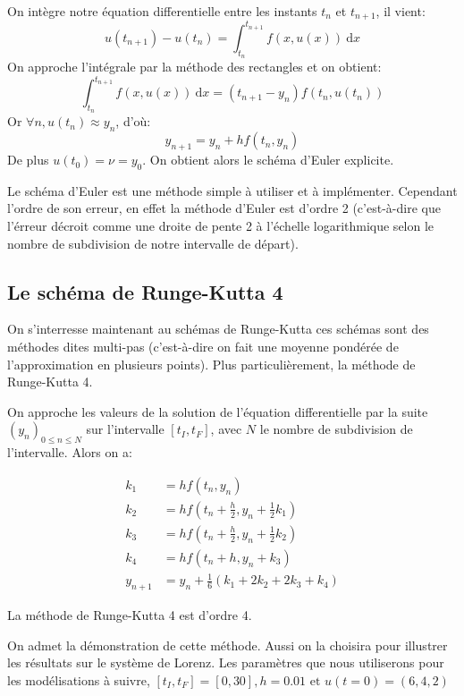 \documentclass{article}
\newcommand{\cad}{c'est-\`a-dire }
\newtheorem[M , nocut]{prop}{Proposition}[section]
\newtheorem[S , nocut]{definition}{Définition}
\newtheorem[S , nocut]{lemme}{Lemme}
\newtheorem[L , nocut]{thm}{Théoreme}
\newtheorem[L , nocut]{cor}{Corollaire}
\begin{document}
\begin{example}
    On intègre notre équation differentielle entre les instants $t_{n}$ et $t_{n+1}$, il vient:
    \[
      u(t_{n+1}) - u(t_n) = \int_{t_n}^{t_{n+1}} f(x,u(x))\ \mathrm{d}x
    \]
    On approche l'intégrale par la méthode des rectangles et on obtient:
    \[
        \int_{t_n}^{t_{n+1}} f(x,u(x))\ \mathrm{d}x = (t_{n+1}-y_n)f(t_n,u(t_n))
    \]Or $\forall n , u(t_n) \approx y_n $, d'où:
    \[
        y_{n+1} = y_n + h f(t_n,y_n)
    \]De plus $u(t_0) = \nu = y_0$. On obtient alors le schéma d'Euler explicite.
\end{example}
Le schéma d'Euler est une méthode simple à utiliser et à implémenter. Cependant l'ordre de son erreur, en effet la méthode d'Euler est d'ordre 2 (\cad que l'érreur décroit comme une droite de pente 2 à l'échelle logarithmique selon le nombre de subdivision de notre intervalle de départ). 
\subsection*{Le schéma de Runge-Kutta 4}

On s'interresse maintenant au schémas de Runge-Kutta ces schémas sont des méthodes dites multi-pas (\cad on fait une moyenne pondérée de l'approximation en plusieurs points). Plus particulièrement, la méthode de Runge-Kutta 4.
\begin{thm}
    On approche les valeurs de la solution de l'équation differentielle par la suite $(y_n)_{0\le n \le N}$ sur l'intervalle $[t_I,t_F]$, avec $N$ le nombre de subdivision de l'intervalle. Alors on a: 

    \begin{align*}
    k_1 &= h f(t_n, y_n) \\
    k_2 &= h f\left(t_n + \frac{h}{2}, y_n + \frac{1}{2}k_1\right) \\
    k_3 &= h f\left(t_n + \frac{h}{2}, y_n + \frac{1}{2}k_2\right) \\
    k_4 &= h f(t_n + h, y_n + k_3)\\
    y_{n+1} &= y_n + \frac{1}{6}(k_1 + 2k_2 + 2k_3 + k_4) 
    \end{align*}
    
    La méthode de Runge-Kutta 4 est d'ordre 4.
\end{thm}
On admet la démonstration de cette méthode. Aussi on la choisira pour illustrer les résultats sur le système de Lorenz. Les paramètres que nous utiliserons pour les modélisations à suivre, $[t_I,t_F] = [0,30], h = 0.01 \text{ et }u(t=0)= (6,4,2)$
\end{document}
